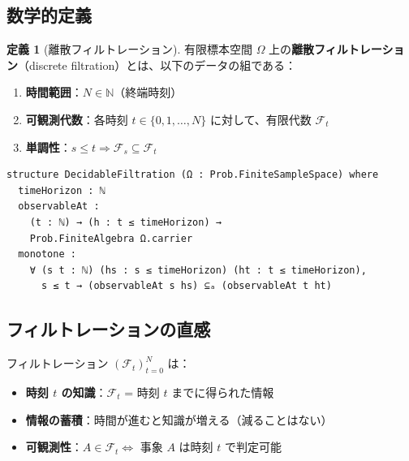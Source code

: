 \documentclass[12pt,a4paper,ja=standard]{bxjsarticle}
\theoremstyle{definition}
\newtheorem{definition}{定義}[section]
\begin{document}
\subsection{数学的定義}

\begin{definition}[離散フィルトレーション]
有限標本空間 $\Omega$ 上の\textbf{離散フィルトレーション}（discrete filtration）とは、以下のデータの組である：

\begin{enumerate}
    \item \textbf{時間範囲}：$N \in \mathbb{N}$（終端時刻）
    \item \textbf{可観測代数}：各時刻 $t \in \{0, 1, \ldots, N\}$ に対して、有限代数 $\mathcal{F}_t$
    \item \textbf{単調性}：$s \leq t \Rightarrow \mathcal{F}_s \subseteq \mathcal{F}_t$
\end{enumerate}
\end{definition}

\begin{tcolorbox}[title=Lean コード（7--13 行目）]
\begin{verbatim}
structure DecidableFiltration (Ω : Prob.FiniteSampleSpace) where
  timeHorizon : ℕ
  observableAt :
    (t : ℕ) → (h : t ≤ timeHorizon) → 
    Prob.FiniteAlgebra Ω.carrier
  monotone :
    ∀ (s t : ℕ) (hs : s ≤ timeHorizon) (ht : t ≤ timeHorizon),
      s ≤ t → (observableAt s hs) ⊆ₐ (observableAt t ht)
\end{verbatim}
\end{tcolorbox}

\subsection{フィルトレーションの直感}

\begin{insight}
フィルトレーション $(\mathcal{F}_t)_{t=0}^N$ は：

\begin{itemize}
    \item \textbf{時刻 $t$ の知識}：$\mathcal{F}_t$ = 時刻 $t$ までに得られた情報
    \item \textbf{情報の蓄積}：時間が進むと知識が増える（減ることはない）
    \item \textbf{可観測性}：$A \in \mathcal{F}_t \Leftrightarrow$ 事象 $A$ は時刻 $t$ で判定可能
\end{itemize}
\end{insight}
\end{document}
